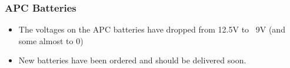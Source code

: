 \documentclass{beamer}
\begin{document}

\begin{frame}
  \frametitle{APC Batteries}

  \begin{itemize}
  \item The voltages on the APC batteries have dropped from 12.5V to ~9V (and some almost to 0)
  \item New batteries have been ordered and should be delivered soon.    
  \end{itemize}

\end{frame}


\end{document}
